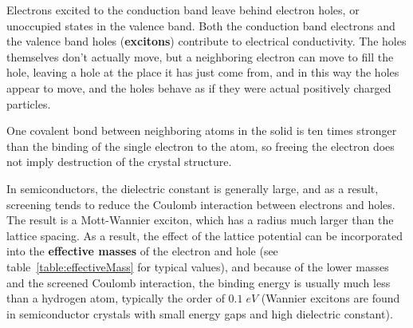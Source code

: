 Electrons excited to the conduction band leave behind electron holes, or unoccupied states in the valence band. Both the conduction band electrons and the valence band holes (\textbf{excitons}) contribute to electrical conductivity. The holes themselves don't actually move, but a neighboring electron can move to fill the hole, leaving a hole at the place it has just come from, and in this way the holes appear to move, and the holes behave as if they were actual positively charged particles.

One covalent bond between neighboring atoms in the solid is ten times stronger than the binding of the single electron to the atom, so freeing the electron does not imply destruction of the crystal structure.


In semiconductors, the dielectric constant is generally large, and as a result, screening tends to reduce the Coulomb interaction between electrons and holes. The result is a Mott-Wannier exciton, which has a radius much larger than the lattice spacing. As a result, the effect of the lattice potential can be incorporated into the \textbf{effective masses} of the electron and hole (see table~\ref{table:effectiveMass} for typical values), and because of the lower masses and the screened Coulomb interaction, the binding energy is usually much less than a hydrogen atom, typically the order of $0.1 \; eV$ (Wannier excitons are found in semiconductor crystals with small energy gaps and high dielectric constant).

